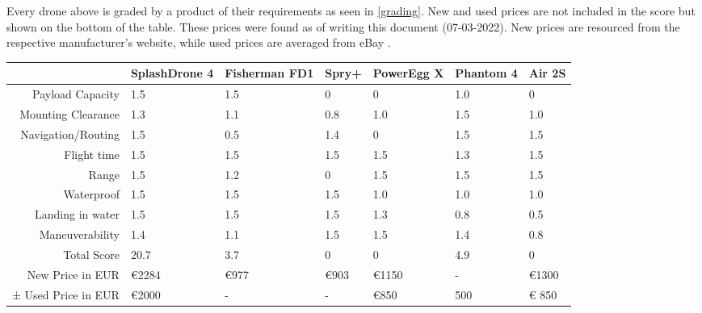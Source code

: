 Every drone above is graded by a product of their requirements as seen in \ref{grading}. New and used prices are not included in the score but shown on the bottom of the table. These prices were found as of writing this document (07-03-2022). New prices are resourced from the respective manufacturer's website, while used prices are averaged from eBay \cite{ebay}.

\sffamily\footnotesize
\tabulinesep=6pt
\begin{tabu}{|r|X[cm]|X[cm]|X[cm]|X[cm]|X[cm]|X[cm]|}
\hline
& SplashDrone 4 & Fisherman FD1 & Spry+ & PowerEgg X & Phantom 4 & Air 2S\\
\hline
Payload Capacity   & 1.5 & 1.5 & 0 & 0 & 1.0 & 0\\
Mounting Clearance & 1.3 & 1.1 & 0.8 & 1.0 & 1.5 & 1.0\\
Navigation/Routing & 1.5 & 0.5 & 1.4 & 0 & 1.5 & 1.5\\
Flight time        & 1.5 & 1.5 & 1.5 & 1.5 & 1.3 & 1.5\\
Range              & 1.5 & 1.2 & 0   & 1.5 & 1.5 & 1.5\\
Waterproof         & 1.5 & 1.5 & 1.5 & 1.0 & 1.0 & 1.0\\
Landing in water   & 1.5 & 1.5 & 1.5 & 1.3 & 0.8 & 0.5\\
Maneuverability    & 1.4 & 1.1 & 1.5 & 1.5 & 1.4 & 0.8\\
\hline
Total Score        & 20.7 & 3.7 & 0 & 0 & 4.9 & 0 \\
New Price in EUR   & €2284 & €977 & €903 & €1150 & - & €1300\\
± Used Price in EUR  & €2000 & - & - & €850 & 500 & € 850\\
\hline
\end{tabu}
\rmfamily\normalsize

